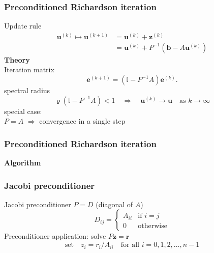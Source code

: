 \documentclass{beamer}
\begin{document}

\begin{frame}
  \frametitle{Preconditioned Richardson iteration}
  Update rule
$$ 
\begin{aligned}
\boldsymbol{u}^{(k)} \mapsto \boldsymbol{u}^{(k+1)} &= \boldsymbol{u}^{(k)} + \boldsymbol{z}^{(k)}\\
&= \boldsymbol{u}^{(k)} + P^{-1}(\boldsymbol{b}-A\boldsymbol{u}^{(k)})
\end{aligned}
$$
\textbf{Theory}\\
Iteration matrix
$$
\boldsymbol{e}^{(k+1)} = \left(\mathbb{I} - P^{-1} A\right)\boldsymbol{e}^{(k)}.
$$
spectral radius
$$
\varrho(\mathbb{I} - P^{-1} A)<1\quad
\Rightarrow\quad \boldsymbol{u}^{(k)}\rightarrow \boldsymbol{u}\quad\text{as $k\rightarrow\infty$}
$$
special case:\\[1ex]
$P=A$ $\Rightarrow$ convergence in a single step
\end{frame}


\begin{frame}[fragile]
  \frametitle{Preconditioned Richardson iteration}
  \textbf{Algorithm}
  \begin{algorithmic}[1]
\EndFor
  \end{algorithmic}
\end{frame}


\begin{frame}
  \frametitle{Jacobi preconditioner}
  Jacobi preconditioner $P=D$ (diagonal of $A$)
$$
D_{ij} = \begin{cases}
A_{ii} & \text{if $i=j$}\\
0 & \text{otherwise}
\end{cases}
$$
Preconditioner application: solve $P\boldsymbol{z}=\boldsymbol{r}$
$$\text{set}\quad z_i = r_i/A_{ii} \quad\text{for all $i=0,1,2,\dots,n-1$}$$
\end{frame}
\end{document}
